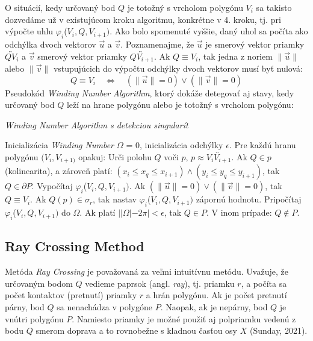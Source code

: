 \documentclass[11pt]{article}
\begin{document}
O situácií, kedy určovaný bod $Q$ je totožný s vrcholom polygónu $V_i$  sa takisto dozvedáme už v existujúcom kroku algoritmu, konkrétne v 4. kroku, tj. pri výpočte uhlu $\varphi_i$($V_i, Q, V_{i+1})$. Ako bolo spomenuté vyššie, daný uhol sa počíta ako odchýlka dvoch vektorov $\vec{u}$ a $\vec{v}$.  Poznamenajme, že $\vec{u}$ je smerový vektor priamky $\overleftrightarrow{QV_i}$ a $\vec{v}$ smerový vektor priamky $\overleftrightarrow{QV_{i+1}}$. Ak $Q \equiv V_i$, tak jedna z noriem $\lVert\vec{u}\rVert$ alebo $\lVert\vec{v}\rVert$ vstupujúcich do výpočtu odchýlky dvoch vektorov musí byť nulová:
\begin{equation*}
Q \equiv V_i \quad \iff \quad (\lVert\vec{u}\rVert=0) \vee (\lVert\vec{v}\rVert=0)
\end{equation*}
Pseudokód \textit{Winding Number Algorithm}, ktorý dokáže detegovať aj stavy, kedy určovaný bod $Q$ leží na hrane polygónu alebo je totožný s vrcholom polygónu:
\begin{algorithm}
    \caption {\textit{Winding Number Algorithm s detekciou singularít}}
    \begin{algorithmic}[1]
        \State Inicializácia \textit{Winding Number $\varOmega$} = 0, inicializácia odchýlky $\epsilon$.
        \State Pre každú hranu polygónu $(V_i, V_{i+1)}$ opakuj:
        \State \indent Urči polohu $Q$ voči $p$, $p \approx \overleftrightarrow{V_iV_{i+1}}$.
        \State \indent \indent Ak $Q \in p$ (kolinearita), a zároveň platí: $(x_i\leq x_q \leq x_{i+1})  \wedge (y_i \leq y_q \leq y_{i+1})$, tak \newline \indent \indent $Q \in \partial P$.
        \State \indent Vypočítaj $\varphi_i$($V_i, Q, V_{i+1})$.
        \State \indent \indent Ak $(\lVert\vec{u}\rVert=0) \vee (\lVert\vec{v}\rVert=0)$, tak $Q \equiv V_i$.
        \State \indent Ak $Q(p) \in \sigma_r$, tak nastav $\varphi_i$($V_i, Q, V_{i+1})$ zápornú hodnotu.
        \State \indent Pripočítaj $\varphi_i$($V_i, Q, V_{i+1})$ do $\varOmega$.
        \State Ak platí $||\varOmega|-2\pi|<\epsilon$, tak $Q \in P$.
        \State V inom prípade: $Q \notin P$.
    \end{algorithmic}
\end{algorithm}


\subsection{Ray Crossing Method}\label{rc}
Metóda \textit{Ray Crossing} je považovaná za veľmi intuitívnu metódu. Uvažuje, že určovaným \linebreak bodom $Q$ vedieme paprsok (angl. \textit{ray}), tj. priamku $r$, a počíta sa počet kontaktov (pretnutí) \linebreak priamky $r$ a hrán polygónu. Ak je počet pretnutí párny, bod $Q$ sa nenachádza v polygóne $P$. Naopak, ak je nepárny, bod $Q$ je vnútri polygónu $P$. Namiesto priamky je možné použiť aj polpriamku vedenú z bodu $Q$ smerom doprava a to rovnobežne s kladnou časťou osy $X$ (Sunday, 2021).
\end{document}
